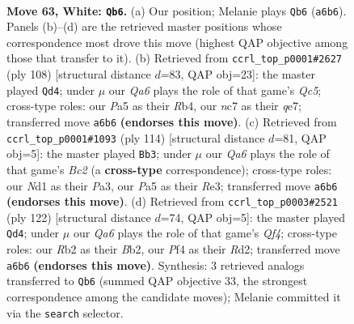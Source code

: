 \documentclass[11pt]{article}
\begin{document}
\clearpage

\begin{figure}[p]\centering
\begin{subfigure}{0.46\textwidth}\centering
\resizebox{\linewidth}{!}{%
\newchessgame
\chessboard[
  setfen={8/2nqbrk1/Q7/P1p2p1p/3p1Pp1/8/1R1BP2P/3N2K1 w - - 1 63},
  showmover=false,
  pgfstyle=straightmove, color=movearrow, markmove={a6-b6}
]}
\caption{}
\end{subfigure}\hfill
\begin{subfigure}{0.46\textwidth}\centering
\resizebox{\linewidth}{!}{%
\newchessgame
\chessboard[
  setfen={4r2k/4qnp1/5p1p/2Q5/1R2p3/4P1BP/5PPK/8 w - - 11 55},
  showmover=false,
  pgfstyle=straightmove, color=movearrow, markmove={c5-d4}
]}
\caption{}
\end{subfigure}
\\[4pt]
\begin{subfigure}{0.46\textwidth}\centering
\resizebox{\linewidth}{!}{%
\newchessgame
\chessboard[
  setfen={2r3k1/3q1pp1/5b1p/1p3P1P/1P2Q3/P3R1PK/2B5/8 w - - 9 58},
  showmover=false,
  pgfstyle=straightmove, color=movearrow, markmove={c2-b3}
]}
\caption{}
\end{subfigure}\hfill
\begin{subfigure}{0.46\textwidth}\centering
\resizebox{\linewidth}{!}{%
\newchessgame
\chessboard[
  setfen={2q3k1/5pp1/p3r2p/1b6/5Q1P/1P3P2/PB1R2P1/6K1 w - - 53 62},
  showmover=false,
  pgfstyle=straightmove, color=movearrow, markmove={f4-d4}
]}
\caption{}
\end{subfigure}
\caption{\textbf{Move 63, White: \texttt{Qb6}.} (a) Our position; Melanie plays \texttt{Qb6} (\texttt{a6b6}). Panels (b)--(d) are the retrieved master positions whose correspondence most drove this move (highest QAP objective among those that transfer to it). (b) Retrieved from \texttt{ccrl\_top\_p0001\#2627} (ply 108) [structural distance $d$=83, QAP obj=23]: the master played \texttt{Qd4}; under $\mu$ our \emph{Qa6} plays the role of that game's \emph{Qc5}; cross-type roles: our \emph{P}a5 as their \emph{R}b4, our \emph{n}c7 as their \emph{q}e7; transferred move \texttt{a6b6} \textbf{(endorses this move)}. (c) Retrieved from \texttt{ccrl\_top\_p0001\#1093} (ply 114) [structural distance $d$=81, QAP obj=5]: the master played \texttt{Bb3}; under $\mu$ our \emph{Qa6} plays the role of that game's \emph{Bc2} (a \textbf{cross-type} correspondence); cross-type roles: our \emph{N}d1 as their \emph{P}a3, our \emph{P}a5 as their \emph{R}e3; transferred move \texttt{a6b6} \textbf{(endorses this move)}. (d) Retrieved from \texttt{ccrl\_top\_p0003\#2521} (ply 122) [structural distance $d$=74, QAP obj=5]: the master played \texttt{Qd4}; under $\mu$ our \emph{Qa6} plays the role of that game's \emph{Qf4}; cross-type roles: our \emph{R}b2 as their \emph{B}b2, our \emph{P}f4 as their \emph{R}d2; transferred move \texttt{a6b6} \textbf{(endorses this move)}. Synthesis: 3 retrieved analogs transferred to \texttt{Qb6} (summed QAP objective 33, the strongest correspondence among the candidate moves); Melanie committed it via the \texttt{search} selector.}
\label{fig:thought-m124}
\end{figure}
\end{document}
